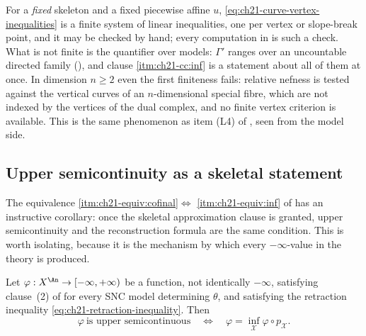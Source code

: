 \begin{remark}
\label{rem:ch21-curve-finite}
For a \emph{fixed} skeleton and a fixed piecewise affine $u$,
\eqref{eq:ch21-curve-vertex-inequalities} is a finite system of linear
inequalities, one per vertex or slope-break point, and it may be checked by hand; every
computation in  is such a check.  What is not finite is
the quantifier over models: $\Gamma'$ ranges over an uncountable directed
family (), and clause
\cref{itm:ch21-cc:inf} is a statement about all of them at once.  In
dimension $n\geq2$ even the first finiteness fails: relative nefness is
tested against the vertical curves of an $n$-dimensional special fibre,
which are not indexed by the vertices of the dual complex, and no finite
vertex criterion is available.  This is the same phenomenon as item (L4) of
, seen from the model side.
\end{remark}

\subsection{Upper semicontinuity as a skeletal statement}
\label{sec:ch21-usc-skeletal}

The equivalence \cref{itm:ch21-equiv:cofinal}$\Leftrightarrow$
\cref{itm:ch21-equiv:inf} of  has an instructive
corollary: once the skeletal approximation clause is granted, upper
semicontinuity and the reconstruction formula are the same condition.  This
is worth isolating, because it is the mechanism by which every
$-\infty$-value in the theory is produced.

\begin{proposition}
\label{prop:ch21-usc-iff-inf}
Let $\varphi:X^{\An}\to[-\infty,+\infty)$ be a function, not identically
$-\infty$, satisfying clause~(2) of  for every SNC
model determining $\theta$, and satisfying the retraction inequality
\eqref{eq:ch21-retraction-inequality}.  Then
\[
 \varphi\ \text{is upper semicontinuous}
 \quad\Longleftrightarrow\quad
 \varphi=\inf_{\mathcal X}\varphi\circ p_{\mathcal X}.
\]
\end{proposition}

